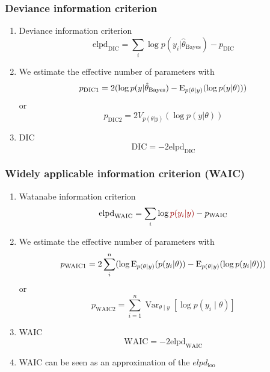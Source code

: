 \documentclass[10pt]{beamer}
\begin{document}
\begin{frame}{}

\frametitle{Deviance information criterion}

\begin{enumerate}
  \item Deviance information criterion
  \[
    \text{elpd}_\text{DIC} = \sum_i \log p(y_i|\hat{\theta}_\text{Bayes}) - p_\text{DIC}
  \]
  \item We estimate the effective number of parameters with
  \[
  p_\text{DIC1} = 2 (\log p(y|\hat{\theta}_\text{Bayes}) - \mathrm{E}_{p(\theta|y)} (\log p(y|\theta)) )
  \]
  or
  \[
  p_\text{DIC2} = 2 V_{p(\theta|y)} (\log p(y|\theta))
  \]
  \item DIC
  \[
    \text{DIC} = - 2 \text{elpd}_\text{DIC}
  \]
\end{enumerate}

\end{frame}

\begin{frame}{}

\frametitle{Widely applicable information criterion (WAIC)}

\begin{enumerate}
  \item Watanabe information criterion
  \[
    \text{elpd}_\text{WAIC} = \sum_i \log \uured{p(y_i|y)} - p_\text{WAIC}
  \]
  \item We estimate the effective number of parameters with
  \[
  p_\text{WAIC1} = 2 \sum^n_i (\log \mathrm{E}_{p(\theta|y)}(p(y_i|\theta)) - \mathrm{E}_{p(\theta|y)} (\log p(y_i|\theta)))
  \]
  or
  \[
  p_\text{WAIC2} = \sum_{i=1}^n \operatorname{Var}_{\theta\mid y}[\log p(y_i\mid\theta)]
  \]
  \item WAIC
  \[
    \text{WAIC} = - 2 \text{elpd}_\text{WAIC}
  \]
  \item WAIC can be seen as an approximation of the $elpd_\text{loo}$
\end{enumerate}

\end{frame}
\end{document}
